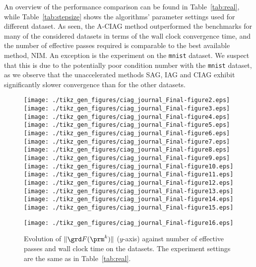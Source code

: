 \documentclass[smallextended]{svjour3}       %
\begin{document}
An overview of the performance comparison   can be 
found in Table~\ref{tab:real}, while Table~\ref{tab:stepsize} 
shows the algorithms' parameter settings used
for different dataset. 
As seen, the {\sf A-CIAG} method outperformed the benchmarks
for many of the considered datasets in terms of the wall clock convergence time,
and the number of effective passes required is comparable to the best available
method, {\sf NIM}. 
An exception is the experiment on the \texttt{mnist} dataset. 
We suspect that this is due to the potentially poor condition number with 
the \texttt{mnist} dataset, as we observe that the unaccelerated methods
{\sf SAG}, {\sf IAG} and {\sf CIAG} exhibit significantly slower convergence
than for the other datasets. 

\begin{figure}[t]
\centering
\texttt{[image: ./tikz\_gen\_figures/ciag\_journal\_Final-figure2.eps]}
\texttt{[image: ./tikz\_gen\_figures/ciag\_journal\_Final-figure3.eps]}
\texttt{[image: ./tikz\_gen\_figures/ciag\_journal\_Final-figure4.eps]}
\texttt{[image: ./tikz\_gen\_figures/ciag\_journal\_Final-figure5.eps]}
\texttt{[image: ./tikz\_gen\_figures/ciag\_journal\_Final-figure6.eps]}
\texttt{[image: ./tikz\_gen\_figures/ciag\_journal\_Final-figure7.eps]}
\texttt{[image: ./tikz\_gen\_figures/ciag\_journal\_Final-figure8.eps]}
\texttt{[image: ./tikz\_gen\_figures/ciag\_journal\_Final-figure9.eps]}
\texttt{[image: ./tikz\_gen\_figures/ciag\_journal\_Final-figure10.eps]}
\texttt{[image: ./tikz\_gen\_figures/ciag\_journal\_Final-figure11.eps]}
\texttt{[image: ./tikz\_gen\_figures/ciag\_journal\_Final-figure12.eps]}
\texttt{[image: ./tikz\_gen\_figures/ciag\_journal\_Final-figure13.eps]}
\texttt{[image: ./tikz\_gen\_figures/ciag\_journal\_Final-figure14.eps]}
\texttt{[image: ./tikz\_gen\_figures/ciag\_journal\_Final-figure15.eps]}\vspace{.4cm}

\texttt{[image: ./tikz\_gen\_figures/ciag\_journal\_Final-figure16.eps]}
\caption{Evolution of $\| \grd F( \prm^k ) \|$ ($y$-axis) against number of effective passes and wall clock
time on the datasets.
The experiment settings are the same as in Table~\ref{tab:real}.}\label{fig:real}\vspace{-.2cm}
\end{figure}
\end{document}
